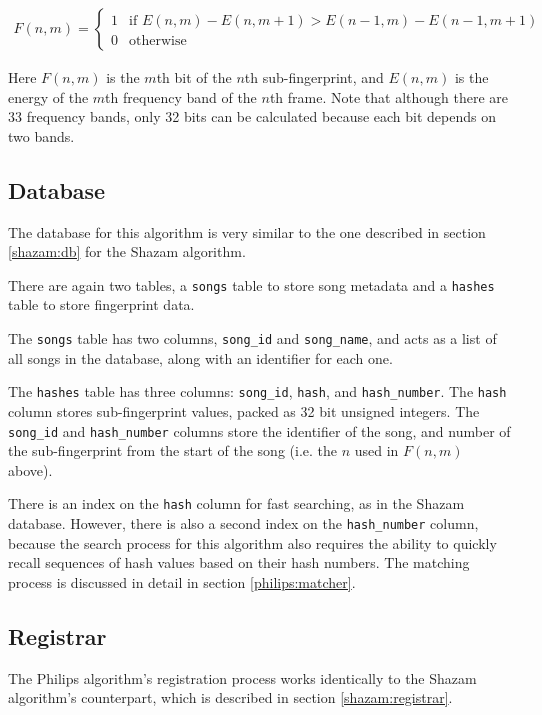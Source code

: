 \documentclass[12pt,a4paper,twoside,openright]{report}
\begin{document}
\begin{align*}
  F(n,m)=
  \begin{cases}
      1 & \text{if } E(n,m)-E(n,m+1) > E(n-1,m)-E(n-1,m+1)\\
      0 & \text{otherwise}
  \end{cases}
\end{align*}

Here $F(n,m)$ is the $m$th bit of the $n$th sub-fingerprint, and $E(n,m)$ is the energy of the $m$th frequency band of the $n$th frame. Note that although there are 33 frequency bands, only 32 bits can be calculated because each bit depends on two bands.


\subsection{Database}

The database for this algorithm is very similar to the one described in section \ref{shazam:db} for the Shazam algorithm.

There are again two tables, a \lstinline{songs} table to store song metadata and a \lstinline{hashes} table to store fingerprint data.

The \lstinline{songs} table has two columns, \lstinline{song_id} and \lstinline{song_name}, and acts as a list of all songs in the database, along with an identifier for each one.

The \lstinline{hashes} table has three columns: \lstinline{song_id}, \lstinline{hash}, and \lstinline{hash_number}. The \lstinline{hash} column stores sub-fingerprint values, packed as 32 bit unsigned integers. The \lstinline{song_id} and \lstinline{hash_number} columns store the identifier of the song, and number of the sub-fingerprint from the start of the song (i.e. the $n$ used in $F(n,m)$ above).

There is an index on the \lstinline{hash} column for fast searching, as in the Shazam database. However, there is also a second index on the \lstinline{hash_number} column, because the search process for this algorithm also requires the ability to quickly recall sequences of hash values based on their hash numbers. The matching process is discussed in detail in section \ref{philips:matcher}.


\subsection{Registrar}

The Philips algorithm's registration process works identically to the Shazam algorithm's counterpart, which is described in section \ref{shazam:registrar}.
\end{document}
